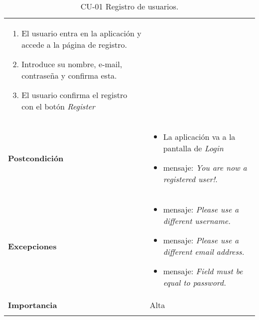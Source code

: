 \begin{longtable}[H]{@{}ll@{}}
\begin{minipage}[t]{0.71\columnwidth}
\begin{enumerate}
\def\labelenumi{\arabic{enumi}.}
\tightlist
\item
  El usuario entra en la aplicación y accede a la página de registro.
\item
  Introduce su nombre, e-mail, contraseña y confirma esta.
\item
  El usuario confirma el registro con el botón \emph{Register}
\end{enumerate}\strut
\end{minipage}\tabularnewline
\begin{minipage}[t]{0.23\columnwidth}%
\textbf{Postcondición}\strut
\end{minipage} & \begin{minipage}[t]{0.71\columnwidth}%
\begin{itemize}
\tightlist
\item
  La aplicación va a la pantalla de \emph{Login}
\item
  mensaje: \textit{You are now a registered user!}.
\end{itemize}\strut

\end{minipage}\tabularnewline
\begin{minipage}[t]{0.23\columnwidth}\raggedright\strut
\textbf{Excepciones}\strut
\end{minipage} & \begin{minipage}[t]{0.71\columnwidth}%
\begin{itemize}
\tightlist
\item
  mensaje: \textit{Please use a different username.}
\item
  mensaje: \textit{Please use a different email address.}
\item
  mensaje: \textit{Field must be equal to password.}  
  
\end{itemize}\strut
\end{minipage}\tabularnewline
\begin{minipage}[t]{0.23\columnwidth}\raggedright\strut
\textbf{Importancia}\strut
\end{minipage} & \begin{minipage}[t]{0.71\columnwidth}\raggedright\strut
Alta\strut
\end{minipage}\tabularnewline
\bottomrule
\caption{CU-01 Registro de usuarios.}
\end{longtable}

